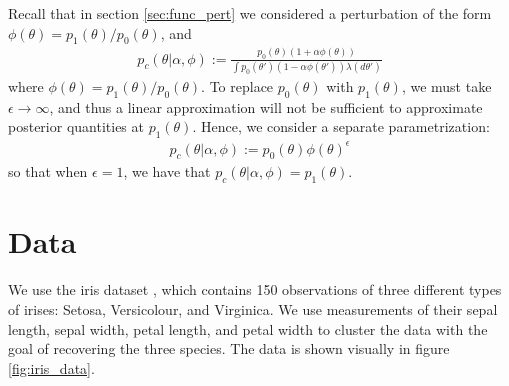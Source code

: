 \documentclass[a4paper]{article}
\begin{document}
Recall that in section \ref{sec:func_pert} we considered a perturbation of the form
$\phi(\theta) = p_1(\theta) / p_0(\theta)$, and
\begin{align}
	p_c(\theta | \alpha, \phi) :=  \frac{p_0(\theta)(1 + \alpha \phi(\theta))}{\int p_0(\theta')(1 - \alpha \phi(\theta'))\lambda(d\theta')}
\end{align}
where $\phi(\theta) = p_1(\theta) / p_0(\theta)$. To replace $p_0(\theta)$ with $p_1(\theta)$, we must take $\epsilon \rightarrow \infty$,
and thus a linear approximation will not be sufficient to approximate posterior quantities at $p_1(\theta)$. Hence, we
consider a separate parametrization:
\begin{align}
	\label{eq:expon_perturb}
	p_c(\theta | \alpha, \phi) :=  p_0(\theta)\phi(\theta)^\epsilon
\end{align}
so that when $\epsilon = 1$, we have that $p_c(\theta | \alpha, \phi) = p_1(\theta)$.

\section{Data}
We use the iris dataset \cite{iris_dataset}, which contains 150 observations of
three different types
of irises: Setosa, Versicolour, and Virginica. We use measurements of their
sepal length, sepal width, petal length, and petal width to cluster the data with
the goal of recovering the three species. The data is shown visually in figure \ref{fig:iris_data}.
\end{document}
